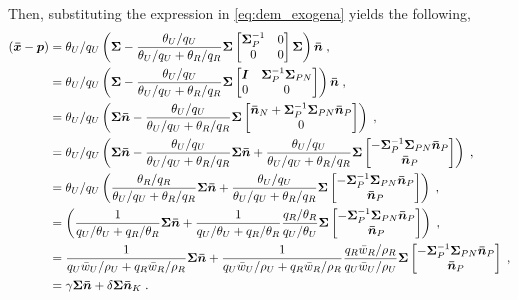 Then, substituting the expression in \eqref{eq:dem_exogena} yields the following,
\begin{equation}
	\begin{split}
		(\bm{\Bar{x}}-\bm{p})&=\theta_{U}/q_{U}\left(\bm{\Sigma} - \frac{\theta_U/q_U}{\theta_U/q_U + \theta_R/q_R}\bm{\Sigma}\begin{bmatrix}
			\bm{\Sigma}^{-1}_{P} & 0\\
			0 & 0
		\end{bmatrix}
		\bm{\Sigma}
		\right)\bm{\Bar{n}}\;,\\
		&=\theta_{U}/q_{U}\left(\bm{\Sigma} - \frac{\theta_U/q_U}{\theta_U/q_U + \theta_R/q_R}\bm{\Sigma}\begin{bmatrix}
			\bm{I} & \bm{\Sigma}^{-1}_{P}\bm{\Sigma}_{PN}\\
			0 & 0
		\end{bmatrix}
		\right)\bm{\Bar{n}}\;,\\
		&= \theta_{U}/q_{U}\left(\bm{\Sigma}\bm{\Bar{n}} - \frac{\theta_U/q_U}{\theta_U/q_U + \theta_R/q_R}\bm{\Sigma}\begin{bmatrix}
			\bm{\Bar{n}}_{N}+\bm{\Sigma}^{-1}_{P}\bm{\Sigma}_{PN}\bm{\Bar{n}}_{P}\\
			0 
		\end{bmatrix}
		\right)\;,\\
		&= \theta_{U}/q_{U}\left(\bm{\Sigma}\bm{\Bar{n}} -\frac{\theta_U/q_U}{\theta_U/q_U + \theta_R/q_R}\bm{\Sigma}\bm{\Bar{n}}+ \frac{\theta_U/q_U}{\theta_U/q_U + \theta_R/q_R}\bm{\Sigma}\begin{bmatrix}
			-\bm{\Sigma}^{-1}_{P}\bm{\Sigma}_{PN}\bm{\Bar{n}}_{P}\\
			\bm{\Bar{n}}_{P} 
		\end{bmatrix}
		\right)\;,\\
		&= \theta_{U}/q_{U}\left(\frac{\theta_R/q_R}{\theta_U/q_U + \theta_R/q_R}\bm{\Sigma}\bm{\Bar{n}}+ \frac{\theta_U/q_U}{\theta_U/q_U + \theta_R/q_R}\bm{\Sigma}\begin{bmatrix}
			-\bm{\Sigma}^{-1}_{P}\bm{\Sigma}_{PN}\bm{\Bar{n}}_{P}\\
			\bm{\Bar{n}}_{P} 
		\end{bmatrix}
		\right)\;,\\
		&= \left(\frac{1}{q_U/\theta_U + q_R/\theta_R}\bm{\Sigma}\bm{\Bar{n}}+ \frac{1}{q_U/\theta_U + q_R/\theta_R}\frac{q_{R}/\theta_R}{q_U/\theta_U}\bm{\Sigma}\begin{bmatrix}
			-\bm{\Sigma}^{-1}_{P}\bm{\Sigma}_{PN}\bm{\Bar{n}}_{P}\\
			\bm{\Bar{n}}_{P} 
		\end{bmatrix}
		\right)\;,\\
		&= \frac{1}{q_U\Bar{w}_U/\rho_U + q_R\Bar{w}_R/\rho_R}\bm{\Sigma}\bm{\Bar{n}}+ \frac{1}{q_U\Bar{w}_U/\rho_U + q_R\Bar{w}_R/\rho_R}\frac{q_{R}\Bar{w}_R/\rho_R}{q_U\Bar{w}_U/\rho_U}\bm{\Sigma}\begin{bmatrix}
			-\bm{\Sigma}^{-1}_{P}\bm{\Sigma}_{PN}\bm{\Bar{n}}_{P}\\
			\bm{\Bar{n}}_{P} 
		\end{bmatrix}
		\;,\\
		&=\gamma\bm{\Sigma}\bm{\Bar{n}} + \delta\bm{\Sigma}\bm{\Bar{n}}_K\;.
	\end{split}
	\label{eq:id-boicott}
\end{equation}
